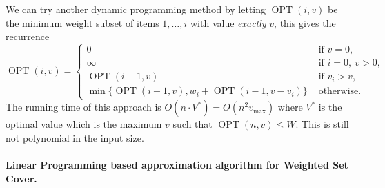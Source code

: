 \documentclass[11pt,a4paper]{article}
\theoremstyle{definition}
\DeclareMathOperator{\OPT}{OPT}
\begin{document}
We can try another dynamic programming method by letting $\OPT(i,v)$ be the minimum weight subset of items $1,\ldots,i$ with value \emph{exactly} $v$, this gives the recurrence
\[
\OPT(i,v) = \begin{cases}
0 &\text{ if } v = 0,\\
\infty &\text{ if } i = 0,\ v > 0, \\
\OPT(i-1,v)&\text{ if } v_i> v,\\
\min\{\OPT(i-1,v), w_i +\OPT(i-1, v - v_i)\} &\text{ otherwise}.
\end{cases} 
\]
The running time of this approach is $O(n\cdot V^*) = O(n^2 v_{\text{max}})$ where $V^*$ is the optimal value which is the maximum $v$ such that $\OPT(n,v) \le W$.
This is still not polynomial in the input size.

\paragraph{Linear Programming based approximation algorithm for Weighted Set Cover.}
\end{document}
